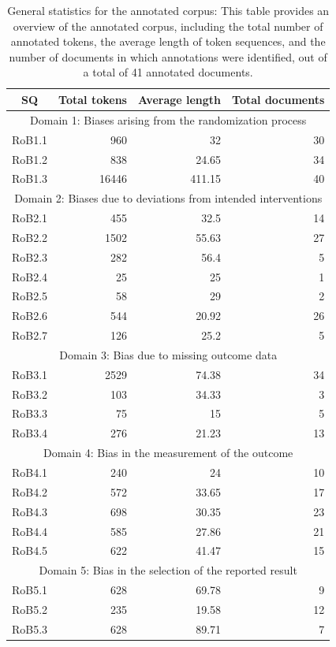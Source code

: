 \documentclass[sn-mathphys,Numbered]{sn-jnl}%
\theoremstyle{thmstyleone}%
\theoremstyle{thmstyletwo}%
\theoremstyle{thmstylethree}%
\begin{document}
%
%
%
\begin{table}[htb]
    \centering
    \caption{General statistics for the annotated corpus: This table provides an overview of the annotated corpus, including the total number of annotated tokens, the average length of token sequences, and the number of documents in which annotations were identified, out of a total of 41 annotated documents.}
    \label{table:stats}
    \begin{tabular}{crrr}
    \toprule[1.0pt]
        SQ & Total tokens & Average length & Total documents \\
    \midrule[1.0pt]
        \multicolumn{4}{c}{Domain 1: Biases arising from the randomization process} \\
        \hline
        RoB1.1 & 960 & 32 & 30 \\
        RoB1.2 & 838 & 24.65 & 34 \\
        RoB1.3 & 16446 & 411.15 & 40 \\
        \hline
        \multicolumn{4}{c}{Domain 2: Biases due to deviations from intended interventions} \\
        \hline
        RoB2.1 & 455 & 32.5 & 14 \\
        RoB2.2 & 1502 & 55.63 & 27 \\
        RoB2.3 & 282 & 56.4 & 5 \\
        RoB2.4 & 25 & 25 & 1 \\
        RoB2.5 & 58 & 29 & 2 \\
        RoB2.6 & 544 & 20.92 & 26 \\
        RoB2.7 & 126 & 25.2 & 5 \\
        \hline
        \multicolumn{4}{c}{Domain 3: Bias due to missing outcome data} \\
        \hline
        RoB3.1 & 2529 & 74.38 & 34 \\
        RoB3.2 & 103 & 34.33 & 3 \\
        RoB3.3 & 75 & 15 & 5 \\
        RoB3.4 & 276 & 21.23 & 13 \\
        \hline
        \multicolumn{4}{c}{Domain 4: Bias in the measurement of the outcome} \\
        \hline
        RoB4.1 & 240 & 24 & 10 \\
        RoB4.2 & 572 & 33.65 & 17 \\
        RoB4.3 & 698 & 30.35 & 23 \\
        RoB4.4 & 585 & 27.86 & 21 \\
        RoB4.5 & 622 & 41.47 & 15 \\
        \hline
        \multicolumn{4}{c}{Domain 5: Bias in the selection of the reported result} \\
        \hline
        RoB5.1 & 628 & 69.78 & 9 \\
        RoB5.2 & 235 & 19.58 & 12 \\
        RoB5.3 & 628 & 89.71 & 7 \\
    \bottomrule[1.0pt]
    \end{tabular}
\end{table}
%
%
%
\end{document}
